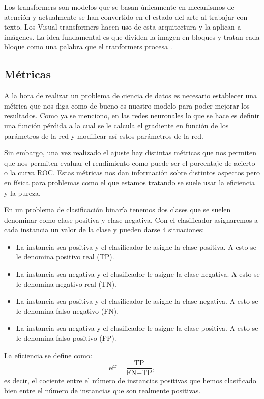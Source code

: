 \documentclass[a4paper,12pt,twoside,titlepage]{article}
\begin{document}
Los transformers \cite{transformers} son modelos que se basan únicamente en mecanismos de atención y actualmente se han convertido en el estado del arte al trabajar con texto. Los Visual transformers hacen uso de esta arquitectura y la aplican a imágenes. La idea fundamental es que dividen la imagen en bloques y tratan cada bloque como una palabra que el tranformers procesa \cite{vit}.

\subsection{Métricas}

A la hora de realizar un problema de ciencia de datos es necesario establecer una métrica que nos diga como de bueno es nuestro modelo para poder mejorar los resultados. Como ya se menciono, en las redes neuronales lo que se hace es definir una función pérdida a la cual se le calcula el gradiente en función de los parámetros de la red y modificar así estos parámetros de la red.

Sin embargo, una vez realizado el ajuste hay distintas métricas que nos permiten que nos permiten evaluar el rendimiento como puede ser el porcentaje de acierto o la curva ROC. Estas métricas nos dan información sobre distintos aspectos pero en física para problemas como el que estamos tratando se suele usar la eficiencia y la pureza.

En un problema de clasificación binaría tenemos dos clases que se suelen denominar como clase positiva y clase negativa. Con el clasificador asignaremos a cada instancia un valor de la clase y pueden darse 4 situaciones:

\begin{itemize}
  \item La instancia sea positiva y el clasificador le asigne la clase positiva. A esto se le denomina positivo real (TP).
  \item La instancia sea negativa y el clasificador le asigne la clase negativa. A esto se le denomina negativo real (TN).
  \item La instancia sea positiva y el clasificador le asigne la clase negativa. A esto se le denomina falso negativo (FN).
  \item La instancia sea negativa y el clasificador le asigne la clase positiva. A esto se le denomina falso positivo (FP).
\end{itemize} 

La eficiencia se define como:
\begin{equation}
  \text{eff} = \frac{\text{TP}}{\text{FN} + \text{TP}},
\end{equation}
es decir, el cociente entre el número de instancias positivas que hemos clasificado bien entre el número de instancias que son realmente positivas.
\end{document}
